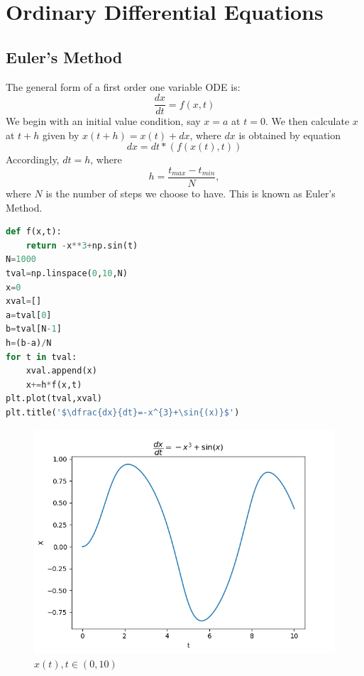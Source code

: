 \section{Ordinary Differential Equations}
\subsection{Euler's Method}
The general form of a first order one variable ODE is:
$$\dfrac{dx}{dt}=f(x,t)$$
We begin with an initial value condition, say $x = a$ at $t=0 $. We then calculate $x$ at $t+h$ given by $x(t+h)= x(t)+dx$, where $dx$ is obtained by equation $$dx=dt*(f(x(t), t))$$ Accordingly, $dt = h$, where $$h=\dfrac{t_{max}-t_{min}}{N},$$where $N$ is the number of steps we choose to have.
This is known as Euler's Method.
\begin{lstlisting}[language=Python, caption=Euler's Method, frame=single, label={lst:euler} ]
def f(x,t):
	return -x**3+np.sin(t)
N=1000
tval=np.linspace(0,10,N)
x=0
xval=[]
a=tval[0]
b=tval[N-1]
h=(b-a)/N
for t in tval:
	xval.append(x)
	x+=h*f(x,t)
plt.plot(tval,xval)
plt.title('$\dfrac{dx}{dt}=-x^{3}+\sin{(x)}$')
\end{lstlisting}
\begin{figure}[H]
	\centering
	\includegraphics[width=0.7\linewidth]{Euler'sMethod}
	\caption{$x(t), t\in(0,10)$}
	\label{fig:eulersmethod}
\end{figure}
\newpage
